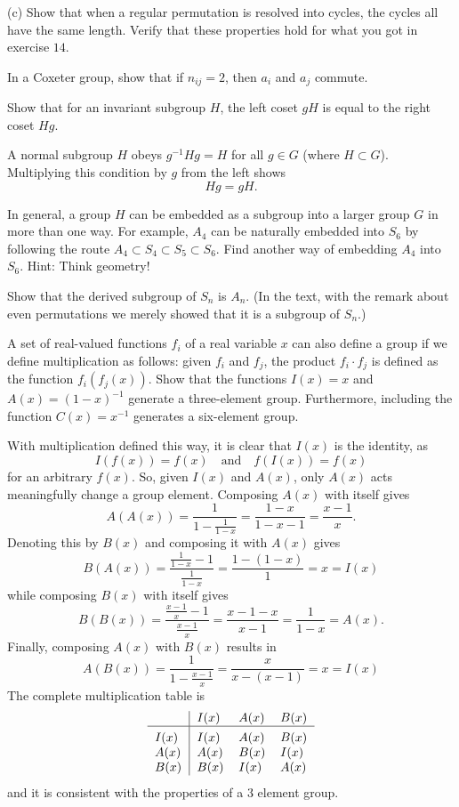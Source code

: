 \documentclass[../group-theory-in-a-nutshell-for-physicists.tex]{subfiles}
\begin{document}
\begin{questions}
(c) Show that when a regular permutation is resolved into cycles, the cycles
all have the same length. Verify that these properties hold for what you
got in exercise $14$.

\question In a Coxeter group, show that if $n_{ij} = 2$, then $a_{i}$ and
$a_{j}$ commute.

\question Show that for an invariant subgroup $H$, the left coset $gH$ is
equal to the right coset $Hg$.

\begin{solution}
A normal subgroup $H$ obeys $g^{- 1}Hg = H$ for all $g \in G$
(where $H \subset G$). Multiplying this condition by $g$ from the
left shows
\[
Hg = gH.
\]
\end{solution}

\question In general, a group $H$ can be embedded as a subgroup into a larger
group $G$ in more than one way. For example, $A_{4}$ can be
naturally embedded into $S_{6}$ by following the route
$A_{4} \subset S_{4} \subset S_{5} \subset S_{6}$. Find another way of
embedding $A_{4}$ into $S_{6}$. Hint: Think geometry!

\question Show that the derived subgroup of $S_{n}$ is $A_{n}$. (In the text,
with the remark about even permutations we merely showed that it is a
subgroup of $S_{n}$.)

\question A set of real-valued functions $f_{i}$ of a real variable $x$ can
also define a group if we define multiplication as follows: given
$f_{i}$ and $f_{j}$, the product $f_{i} \cdot f_{j}$ is defined as
the function \(f_{i}(f_{j}(x))\). Show that the functions $I(x) = x$
and $A(x) = (1 - x)^{- 1}$ generate a three-element group.
Furthermore, including the function $C(x) = x^{- 1}$ generates a
six-element group.

\begin{solution}
	With multiplication defined this way, it is clear that $I(x)$ is the identity, as
	\[
		I(f(x)) = f(x) \quad \text{and} \quad f(I(x)) = f(x)
	\]
	for an arbitrary $f(x)$. So, given $I(x)$ and $A(x)$, only $A(x)$ acts meaningfully change a group element. Composing $A(x)$ with itself gives
	\[
		A(A(x)) = \frac{1}{1 - \frac{1}{1 - x}} = \frac{1 - x}{1 - x - 1} = \frac{x - 1}{x}.
	\]
	Denoting this by $B(x)$ and composing it with $A(x)$ gives
	\[
		B(A(x)) = \frac{\frac{1}{1 - x} - 1}{\frac{1}{1 - x}} = \frac{1 - (1 - x)}{1} = x = I(x)
	\]
	while composing $B(x)$ with itself gives
	\[
		B(B(x)) = \frac{\frac{x - 1}{x} - 1}{\frac{x - 1}{x}} = \frac{x - 1 - x}{x - 1} = \frac{1}{1 - x} = A(x).
	\]
	Finally, composing $A(x)$ with $B(x)$ results in
	\[
		A(B(x)) = \frac{1}{1 - \frac{x - 1}{x}} = \frac{x}{x - (x - 1)} = x = I(x)
	\]
	The complete multiplication table is
	\[
	\begin{tabular}{>{$}l<{$}|*{3}{>{$}l<{$}}}
		~    & I(x) & A(x) & B(x) \\
		\hline\vrule height 12pt width 0pt
		I(x) & I(x) & A(x) & B(x) \\
		A(x) & A(x) & B(x) & I(x)    \\
		B(x) & B(x) & I(x) & A(x) \\
	\end{tabular} 
	\]
	and it is consistent with the properties of a $3$ element group.
	

\end{solution}
\end{questions}
\end{document}
